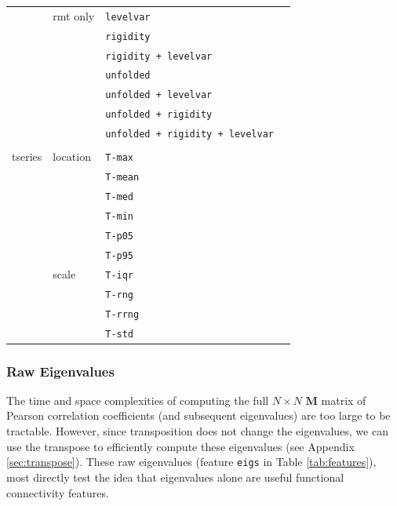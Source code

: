 \documentclass[12pt]{spieman}  %
\newcommand{\code}[1]{\small\texttt{#1}\normalsize}
\newcommand{\tcode}[1]{\footnotesize\texttt{#1}\normalsize}
\begin{document}
\begin{spacing}{2}
\begin{table}[h!]
\begin{tabular}{lllr}
               & rmt only      & \tcode{levelvar}                       \\
               &               & \tcode{rigidity}                       \\
               &               & \tcode{rigidity + levelvar}            \\
               &               & \tcode{unfolded}                       \\
               &               & \tcode{unfolded + levelvar}            \\
               &               & \tcode{unfolded + rigidity}            \\
               &               & \tcode{unfolded + rigidity + levelvar} \\
               &               &                                        \\
tseries        & location      & \tcode{T-max}                          \\
               &               & \tcode{T-mean}                         \\
               &               & \tcode{T-med}                          \\
               &               & \tcode{T-min}                          \\
               &               & \tcode{T-p05}                          \\
               &               & \tcode{T-p95}                          \\
               & scale         & \tcode{T-iqr}                          \\
               &               & \tcode{T-rng}                          \\
               &               & \tcode{T-rrng}                         \\
               &               & \tcode{T-std}                          \\
\hline
\end{tabular}
\end{table}

\subsubsection{Raw Eigenvalues}
\label{sec:raw-eigs}

The time and space complexities of computing the full \(N \times N\)
\(\mathbf{M}\) matrix of Pearson correlation coefficients (and subsequent
eigenvalues) are too large to be tractable. However, since transposition does
not change the eigenvalues, we can use the transpose to efficiently compute
these eigenvalues (see Appendix \ref{sec:transpose}). These raw eigenvalues
(feature \code{eigs} in Table \ref{tab:features}), most directly test the idea
that eigenvalues alone are useful functional connectivity features.


\end{spacing}
\end{document}
